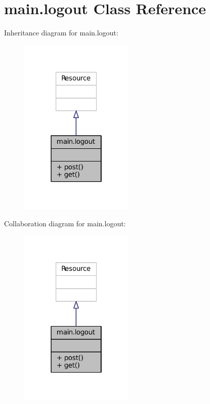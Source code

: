 \hypertarget{classmain_1_1logout}{}\section{main.\+logout Class Reference}
\label{classmain_1_1logout}


Inheritance diagram for main.\+logout\+:
\nopagebreak
\begin{figure}[H]
\begin{center}
\leavevmode
\includegraphics[width=154pt]{classmain_1_1logout__inherit__graph}
\end{center}
\end{figure}


Collaboration diagram for main.\+logout\+:
\nopagebreak
\begin{figure}[H]
\begin{center}
\leavevmode
\includegraphics[width=154pt]{classmain_1_1logout__coll__graph}
\end{center}
\end{figure}
